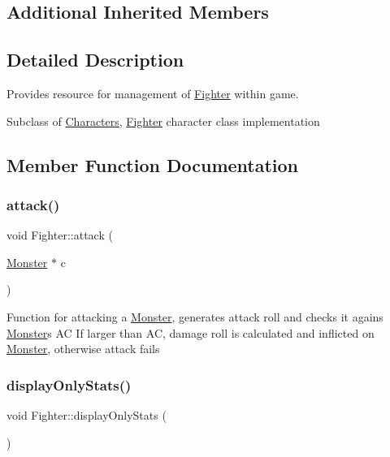\subsection*{Additional Inherited Members}


\subsection{Detailed Description}
Provides resource for management of \hyperlink{class_fighter}{Fighter} within game. 

Subclass of \hyperlink{class_characters}{Characters}, \textquotesingle{}\hyperlink{class_fighter}{Fighter}\textquotesingle{} character class implementation 

\subsection{Member Function Documentation}
\hypertarget{class_fighter_ac1a886e2f60333e38e90fff2a0f6107b}{}\label{class_fighter_ac1a886e2f60333e38e90fff2a0f6107b} 
\subsubsection{\texorpdfstring{attack()}{attack()}}
{\footnotesize\ttfamily void Fighter\+::attack (\begin{DoxyParamCaption}\item[{\hyperlink{class_monster}{Monster} $\ast$}]{c }\end{DoxyParamCaption})}

Function for attacking a \hyperlink{class_monster}{Monster}, generates attack roll and checks it agains \hyperlink{class_monster}{Monster}\textquotesingle{}s AC If larger than AC, damage roll is calculated and inflicted on \hyperlink{class_monster}{Monster}, otherwise attack fails \hypertarget{class_fighter_a5dd8b95b965832bbae65d6285a9bac53}{}\label{class_fighter_a5dd8b95b965832bbae65d6285a9bac53} 
\subsubsection{\texorpdfstring{display\+Only\+Stats()}{displayOnlyStats()}}
{\footnotesize\ttfamily void Fighter\+::display\+Only\+Stats (\begin{DoxyParamCaption}{ }\end{DoxyParamCaption})}

